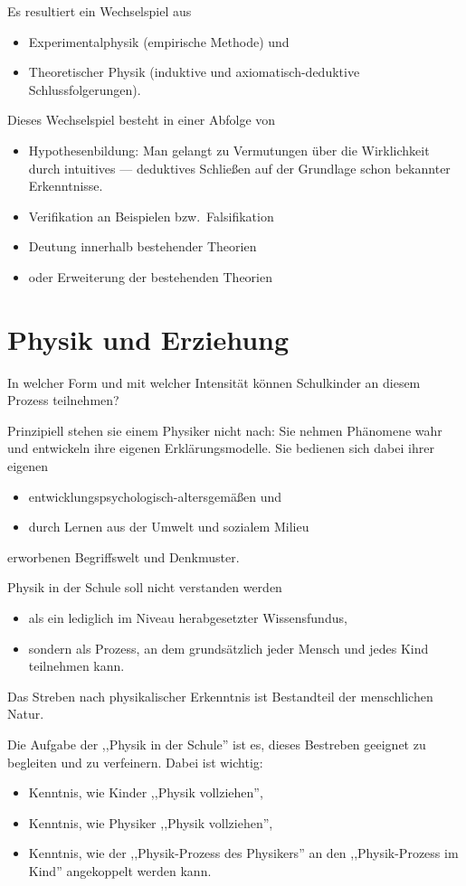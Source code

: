 Es resultiert ein Wechselspiel aus
\begin{itemize}
	\item Experimentalphysik (empirische Methode) \quad und
	\item Theoretischer Physik (induktive und axiomatisch-deduktive Schlussfolgerungen).
\end{itemize}

Dieses Wechselspiel besteht in einer Abfolge von
\begin{itemize}
	\item Hypothesenbildung: Man gelangt zu Vermutungen \"{u}ber die Wirklichkeit durch intuitives --- deduktives Schlie{\ss}en auf der Grundlage schon bekannter Erkenntnisse.
	\item Verifikation an Beispielen bzw.\ Falsifikation
	\item Deutung innerhalb bestehender Theorien
	\item oder Erweiterung der bestehenden Theorien
\end{itemize}

\bip\bip
\section{Physik und Erziehung}
In welcher Form und mit welcher Intensit\"{a}t k\"{o}nnen Schulkinder an diesem Prozess teilnehmen?

Prinzipiell stehen sie einem Physiker nicht nach: Sie nehmen Ph\"{a}nomene wahr und entwickeln ihre eigenen Erkl\"{a}rungsmodelle. Sie bedienen sich dabei ihrer eigenen
\begin{itemize}
	\item entwicklungspsychologisch-altersgem\"{a}{\ss}en \quad und
	\item durch Lernen aus der Umwelt und sozialem Milieu
\end{itemize}
erworbenen Begriffswelt und Denkmuster.

\mip
Physik in der Schule soll nicht verstanden werden
\begin{itemize}
	\item als ein lediglich im Niveau herabgesetzter Wissensfundus,
	\item sondern als Prozess, an dem grunds\"{a}tzlich jeder Mensch und jedes Kind teilnehmen kann.
\end{itemize}

Das Streben nach physikalischer Erkenntnis ist Bestandteil der menschlichen Natur.

\mip
Die Aufgabe der ,,Physik in der Schule'' ist es, dieses Bestreben geeignet zu begleiten und
zu verfeinern. Dabei ist wichtig:
\begin{itemize}
	\item Kenntnis, wie Kinder ,,Physik vollziehen'',
	\item Kenntnis, wie Physiker ,,Physik vollziehen'',
	\item Kenntnis, wie der ,,Physik-Prozess des Physikers'' an den ,,Physik-Prozess im Kind'' angekoppelt werden kann.
\end{itemize}

